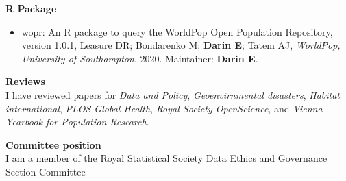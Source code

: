 \documentclass[
]{friggeri-cv}
\begin{document}
\begin{noside}
\textbf{R Package}
\begin{itemize}
\item wopr: An R package to query the WorldPop Open Population Repository, version 1.0.1, Leasure DR; Bondarenko M; \textbf{Darin E}; Tatem AJ, \textit{WorldPop, University of Southampton}, 2020. Maintainer: \textbf{Darin E}. \href{https://apps.worldpop.org/woprVision/}{\scriptsize{}}
\end{itemize}

\textbf{Reviews} \\
I have reviewed papers for \textit{Data and Policy}, \textit{Geoenvirnmental disasters}, \textit{Habitat international}, \textit{PLOS Global Health}, \textit{Royal Society OpenScience}, and \textit{Vienna Yearbook for Population Research}.

\textbf{Committee position} \\
I am a member of the Royal Statistical Society Data Ethics and Governance Section Committee
\end{noside}
\null\newpage
\end{document}
